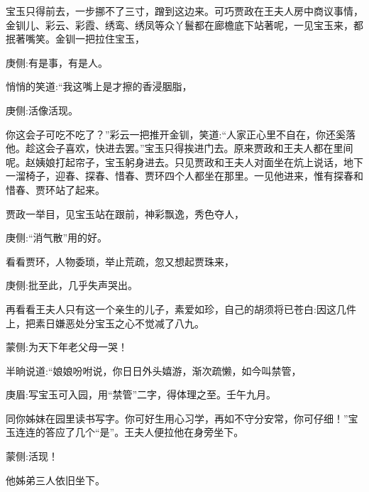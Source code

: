 \begin{parag}
    宝玉只得前去，一步挪不了三寸，蹭到这边来。可巧贾政在王夫人房中商议事情，金钏儿、彩云、彩霞、绣鸾、绣凤等众丫鬟都在廊檐底下站著呢，一见宝玉来，都抿著嘴笑。金钏一把拉住宝玉，\begin{note}庚侧:有是事，有是人。\end{note}悄悄的笑道:“我这嘴上是才擦的香浸胭脂，\begin{note}庚侧:活像活现。\end{note}你这会子可吃不吃了？”彩云一把推开金钏，笑道:“人家正心里不自在，你还奚落他。趁这会子喜欢，快进去罢。”宝玉只得挨进门去。原来贾政和王夫人都在里间呢。赵姨娘打起帘子，宝玉躬身进去。只见贾政和王夫人对面坐在炕上说话，地下一溜椅子，迎春、探春、惜春、贾环四个人都坐在那里。一见他进来，惟有探春和惜春、贾环站了起来。
\end{parag}


\begin{parag}
    贾政一举目，见宝玉站在跟前，神彩飘逸，秀色夺人，\begin{note}庚侧:“消气散”用的好。\end{note}看看贾环，人物委琐，举止荒疏，忽又想起贾珠来，\begin{note}庚侧:批至此，几乎失声哭出。\end{note}再看看王夫人只有这一个亲生的儿子，素爱如珍，自己的胡须将已苍白:因这几件上，把素日嫌恶处分宝玉之心不觉减了八九。\begin{note}蒙侧:为天下年老父母一哭！\end{note}半晌说道:“娘娘吩咐说，你日日外头嬉游，渐次疏懒，如今叫禁管，\begin{note}庚眉:写宝玉可入园，用“禁管”二字，得体理之至。壬午九月。\end{note}同你姊妹在园里读书写字。你可好生用心习学，再如不守分安常，你可仔细！”宝玉连连的答应了几个“是”。王夫人便拉他在身旁坐下。\begin{note}蒙侧:活现！\end{note}他姊弟三人依旧坐下。
\end{parag}


